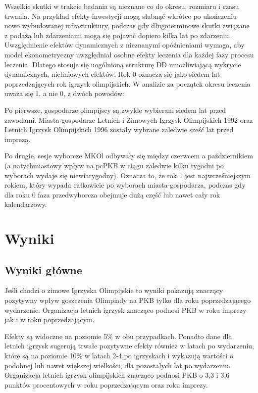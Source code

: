 \documentclass[12pt]{article}
\begin{document}
Wszelkie skutki w trakcie badania są nieznane co do okresu, rozmiaru i czasu trwania. Na przykład efekty inwestycji mogą słabnąć wkrótce po ukończeniu nowo wybudowanej infrastruktury, podczas gdy długoterminowe skutki związane z podażą lub zdarzeniami mogą się pojawić dopiero kilka lat po zdarzeniu. Uwzględnienie efektów dynamicznych z nieznanymi opóźnieniami wymaga, aby model ekonometryczny uwzględniał osobne efekty leczenia dla każdej fazy procesu leczenia. Dlatego stosuje się uogólnioną strukturę DD umożliwiającą wykrycie dynamicznych, nieliniowych efektów. Rok 0 oznacza się jako siedem lat poprzedzających rok igrzysk olimpijskich. W analizie za początek okresu leczenia uważa się 1, a nie 0, z dwóch powodów: 

Po pierwsze, gospodarze olimpijscy są zwykle wybierani siedem lat przed zawodami. Miasta-gospodarze Letnich i Zimowych Igrzysk Olimpijskich 1992 oraz Letnich Igrzysk Olimpijskich 1996 zostały wybrane zaledwie sześć lat przed imprezą.

Po drugie, sesje wyborcze MKOl odbywały się między czerwcem a październikiem (a natychmiastowy wpływ na pcPKB w ciągu zaledwie kilku tygodni po wyborach wydaje się niewiarygodny). Oznacza to, że rok 1 jest najwcześniejszym rokiem, który wypada całkowicie po wyborach miasta-gospodarza, podczas gdy dla roku 0 faza przedwyborcza obejmuje dużą część lub nawet cały rok kalendarzowy.

\newpage
\section{Wyniki}
    \subsection{Wyniki główne}
    Jeśli chodzi o zimowe Igrzyska Olimpijskie to wyniki pokazują znaczący pozytywny wpływ goszczenia Olimpiady na PKB tylko dla roku poprzedzającego wydarzenie. Organizacja letnich igrzysk znacząco podnosi PKB w roku imprezy jak i w roku poprzedzającym.
    
    Efekty są widoczne na poziomie 5\% w obu przypadkach. Ponadto dane dla letnich igrzysk sugerują trwałe pozytywne efekty również w latach po wydarzeniu, które są na poziomie 10\% w latach 2-4 po igrzyskach i wykazują wartości o podobnej lub nawet większej wielkości, dla pozostałych lat po wydarzeniu. Organizacja letnich igrzysk olimpijskich znacząco podnosi PKB o 3,3 i 3,6 punktów procentowych w roku poprzedzającym oraz roku imprezy. \\
    
\end{document}

